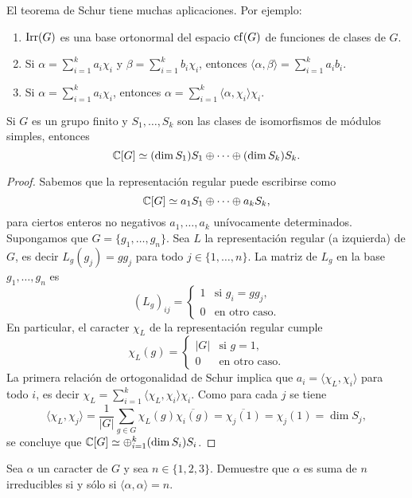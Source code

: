   
El teorema de Schur tiene muchas aplicaciones. Por ejemplo:
\begin{enumerate}
    \item $\operatorname{Irr}(G)$ es una base ortonormal del espacio $\operatorname{cf}(G)$ de funciones de clases de $G$. 
    \item Si $\alpha=\sum_{i=1}^ka_i\chi_i$ y $\beta=\sum_{i=1}^kb_i\chi_i$, entonces
    $\langle\alpha,\beta\rangle=\sum_{i=1}^ka_ib_i$. 
    \item Si $\alpha=\sum_{i=1}^ka_i\chi_i$, entonces $\alpha=\sum_{i=1}^k\langle\alpha,\chi_i\rangle\chi_i$.
\end{enumerate}

\begin{corollary}
Si $G$ es un grupo finito y $S_1,\dots,S_k$ son las clases
de isomorfismos de módulos simples, entonces 
\[
\mathbb{C}[G]\simeq (\dim S_1)S_1\oplus\cdots\oplus (\dim S_k)S_k.
\]
\end{corollary}

\begin{proof}
    Sabemos que la representación regular puede escribirse como
    \[
    \mathbb{C}[G]\simeq a_1S_1\oplus\cdots\oplus a_kS_k,
    \]
    para ciertos enteros no negativos $a_1,\dots,a_k$ 
    unívocamente determinados. 
    Supongamos que $G=\{g_1,\dots,g_n\}$. Sea $L$ la representación regular (a izquierda) de $G$, es decir
    $L_g(g_j)=gg_j$ para todo $j\in\{1,\dots,n\}$. La matriz de $L_g$ 
    en la base $g_1,\dots,g_n$ es
    \[
    (L_g)_{ij}=\begin{cases}
    1 & \text{si $g_i=gg_j$},\\
    0 & \text{en otro caso}.
    \end{cases}
    \]
    En particular, el caracter $\chi_L$ de la representación regular cumple 
    \[
    \chi_L(g)=\begin{cases}
    |G| & \text{si $g=1$},\\
    0 & \text{en otro caso}.
    \end{cases}
    \]
    La primera relación de ortogonalidad de Schur implica que $a_i=\langle\chi_L,\chi_i\rangle$ para todo $i$, es decir 
    $\chi_L=\sum_{i=1}^k\langle\chi_L,\chi_i\rangle\chi_i$. 
    Como para cada $j$ se tiene 
    \[
    \langle\chi_L,\chi_j\rangle=\frac{1}{|G|}\sum_{g\in G}\chi_L(g)\overline{\chi_i(g)}=\overline{\chi_j(1)}=\chi_j(1)=\dim S_j,
    \]
    se concluye que $\mathbb{C}[G]\simeq\oplus_{i=1}^k(\dim S_i)S_i$. 
\end{proof}

\begin{exercise}
    Sea $\alpha$ un caracter de $G$ y sea $n\in\{1,2,3\}$. Demuestre que $\alpha$ es suma
    de $n$ irreducibles si y sólo si $\langle\alpha,\alpha\rangle=n$. 
\end{exercise}

